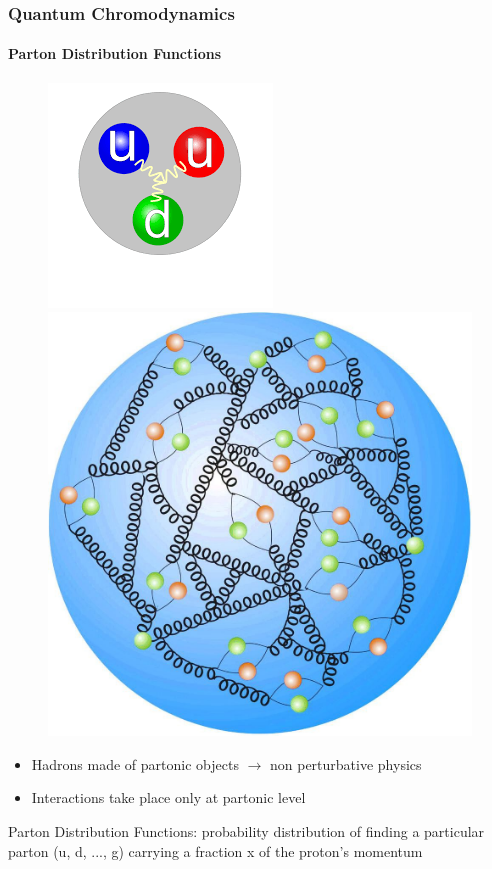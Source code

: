 \documentclass[aspectratio=43]{beamer}
\begin{document}
\begin{frame}

	\frametitle{Quantum Chromodynamics}
	\framesubtitle{Parton Distribution Functions}
	
	\begin{figure}
		\includegraphics[width = 0.5\linewidth]{proton.png}
		\endminipage\hfill
		\includegraphics[width = 0.4\linewidth]{proton2.jpg}
		\endminipage
	\end{figure}
	

	\begin{itemize}
		\item Hadrons made of partonic objects $\longrightarrow$ non perturbative physics
		\item Interactions take place only at partonic level
	\end{itemize}

	{\color{blue}Parton Distribution Functions: probability distribution of finding a particular parton (u, d, ..., g) carrying a fraction x of the proton's momentum}

\end{frame}
\end{document}
